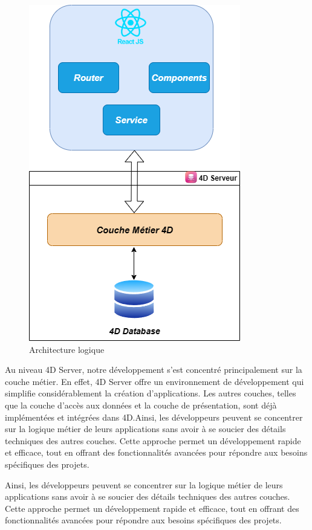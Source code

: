 \begin{figure}[htbp]
   \centering
   \includegraphics[scale=0.5]{Images/logi.png} 
   \caption{Architecture logique}
   \label{fig:logiqueArch}
\end{figure}

Au niveau 4D Server, notre développement s’est concentré principalement sur la couche métier. En effet, 4D Server offre un environnement de développement qui simplifie considérablement la création d’applications. Les autres couches, telles que la couche d’accès aux données et la couche de présentation, sont déjà implémentées et intégrées dans 4D.Ainsi, les développeurs peuvent se concentrer sur la logique métier de leurs applications sans avoir à se soucier des détails techniques des autres couches. Cette approche permet un développement rapide et efficace, tout en offrant des fonctionnalités avancées pour répondre aux besoins spécifiques des projets.
\newline

Ainsi, les développeurs peuvent se concentrer sur la logique métier de leurs applications sans avoir à se soucier des détails techniques des autres couches. Cette approche permet un développement rapide et eﬀicace, tout en offrant des fonctionnalités avancées pour répondre aux besoins spécifiques des projets.
\newline

